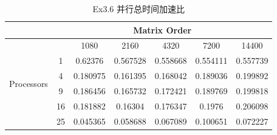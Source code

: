 \documentclass[UTF8]{article}
\begin{document}
            \begin{table}[h]
                \caption{Ex3.6 并行总时间加速比}
                \label{tab:my-table}
                \centering
                \scalebox{0.8} {
                \begin{tabular}{|c|c|c|c|c|c|c|}
                \hline
                                            & \multicolumn{6}{c|}{Matrix Order}                         \\ \hline
                \multirow{6}{*}{Processors} &    & 1080     & 2160     & 4320     & 7200     & 14400    \\ \cline{2-7} 
                                            & 1  & 0.62376  & 0.567528 & 0.558668 & 0.554111 & 0.557739 \\ \cline{2-7} 
                                            & 4  & 0.180975 & 0.161395 & 0.168042 & 0.189036 & 0.199892 \\ \cline{2-7} 
                                            & 9  & 0.186456 & 0.165732 & 0.172421 & 0.189769 & 0.199818 \\ \cline{2-7} 
                                            & 16 & 0.181882 & 0.16304  & 0.176347 & 0.1976   & 0.206098 \\ \cline{2-7} 
                                            & 25 & 0.045365 & 0.058688 & 0.067089 & 0.100651 & 0.072227 \\ \hline
                \end{tabular}}
                \end{table}
\end{document}
